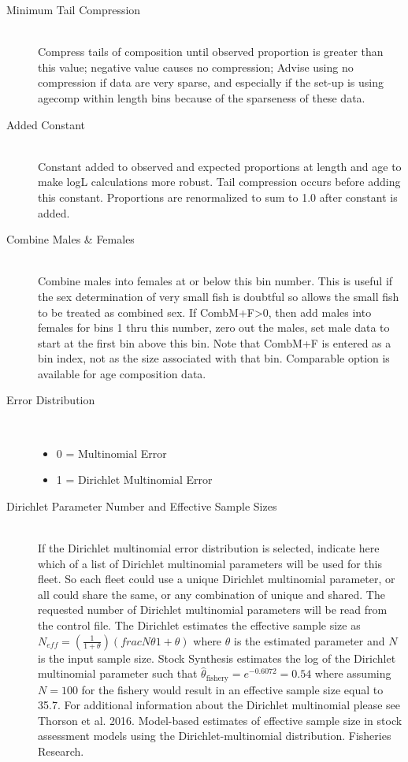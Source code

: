 \begin{description}
	\item[Minimum Tail Compression]\hfill\\
	Compress tails of composition until observed proportion is greater than this value; negative value causes no compression; Advise using no compression if data are very sparse, and especially if the set-up is using agecomp within length bins because of the sparseness of these data.
	\item[Added Constant]\hfill\\
	Constant added to observed and expected proportions at length and age to make logL calculations more robust.  Tail compression occurs before adding this constant.  Proportions are renormalized to sum to 1.0 after constant is added.
	\item[Combine Males \& Females]\hfill\\
	Combine males into females at or below this bin number.  This is useful if the sex determination of very small fish is doubtful so allows the small fish to be treated as combined sex.  If CombM+F>0, then add males into females for bins 1 thru this number, zero out the males, set male data to start at the first bin above this bin.  Note that CombM+F is entered as a bin index, not as the size associated with that bin.  Comparable option is available for age composition data.
	\item[Error Distribution]\
	\begin{itemize}
		\item 0 = Multinomial Error
		\item 1 = Dirichlet Multinomial Error
	\end{itemize}
	\item[Dirichlet Parameter Number and Effective Sample Sizes]\hfill\\
	If the Dirichlet multinomial error distribution is selected, indicate here which of a list of Dirichlet multinomial parameters will be used for this fleet.  So each fleet could use a unique Dirichlet multinomial parameter, or all could share the same, or any combination of unique and shared.  The requested number of Dirichlet multinomial parameters will be read from the control file.  The Dirichlet estimates the effective sample size as $N_{eff}=(\frac{1}{1+\theta})(frac{N\theta}{1+\theta})$ where $\theta$ is the estimated parameter and $N$ is the input sample size.  Stock Synthesis estimates the log of the Dirichlet multinomial parameter such that $\hat{\theta}_{\text{fishery}} = e^{-0.6072} = 0.54$ where assuming $N=100$ for the fishery would result in an effective sample size equal to 35.7.  For additional information about the Dirichlet multinomial please see Thorson et al. 2016. Model-based estimates of effective sample size in stock assessment models using the Dirichlet-multinomial distribution. Fisheries Research.
\end{description}

